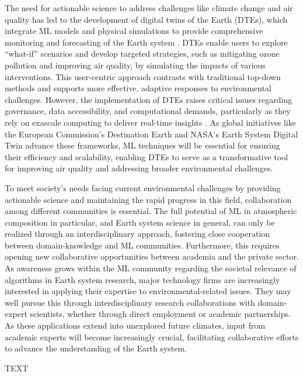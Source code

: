 \documentclass[gmd, manuscript]{copernicus}
\begin{document}
The need for actionable science to address challenges like climate change and air quality has led to the development of digital twins of the Earth (DTEs), which integrate ML models and physical simulations to provide comprehensive monitoring and forecasting of the Earth system \citep{bauer_digital_2021, Bauer2024}. DTEs enable users to explore “what-if” scenarios and develop targeted strategies, such as mitigating ozone pollution and improving air quality, by simulating the impacts of various interventions. This user-centric approach contrasts with traditional top-down methods and supports more effective, adaptive responses to environmental challenges. However, the implementation of DTEs raises critical issues regarding governance, data accessibility, and computational demands, particularly as they rely on exascale computing to deliver real-time insights \citep{Hazeleger2024}. As global initiatives like the European Commission’s Destination Earth and NASA’s Earth System Digital Twin advance these frameworks, ML techniques will be essential for ensuring their efficiency and scalability, enabling DTEs to serve as a transformative tool for improving air quality and addressing broader environmental challenges.

To meet society's needs facing current environmental challenges by providing actionable science and maintaining the rapid progress in this field, collaboration among different communities is essential. The full potential of ML in atmospheric composition in particular, and Earth system science in general, can only be realized through an interdisciplinary approach, fostering close cooperation between domain-knowledge and ML communities. Furthermore, this requires opening new collaborative opportunities between academia and the private sector. As awareness grows within the ML community regarding the societal relevance of algorithms in Earth system research, major technology firms are increasingly interested in applying their expertise to environmental-related issues. They may well pursue this through interdisciplinary research collaborations with domain-expert scientists, whether through direct employment or academic partnerships. As these applications extend into unexplored future climates, input from academic experts will become increasingly crucial, facilitating collaborative efforts to advance the understanding of the Earth system.


\conclusions  %
TEXT

\end{document}
